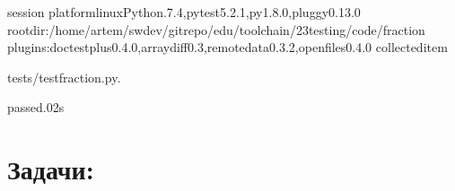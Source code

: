 \documentclass[letterpaper,10pt,russian]{sphinxmanual}
\begin{document}
\begin{sphinxVerbatim}[commandchars=\\\{\}]
session
platformlinux\PYGZhy{}\PYGZhy{}Python.7.4,pytest\PYGZhy{}5.2.1,py\PYGZhy{}1.8.0,pluggy\PYGZhy{}0.13.0
rootdir:/home/artem/swdev/gitrepo/edu/toolchain/23\PYGZus{}testing/code/fraction
plugins:doctestplus\PYGZhy{}0.4.0,arraydiff\PYGZhy{}0.3,remotedata\PYGZhy{}0.3.2,openfiles\PYGZhy{}0.4.0
collecteditem

tests/test\PYGZus{}fraction.py.\PYG{o}{[}\PYGZpc{}\PYG{o}{]}

passed.02s
\end{sphinxVerbatim}

\sphinxstepscope


\section{Задачи:}
\label{\detokenize{educational_materials/testing/exercises:id1}}\label{\detokenize{educational_materials/testing/exercises::doc}}
\end{document}
